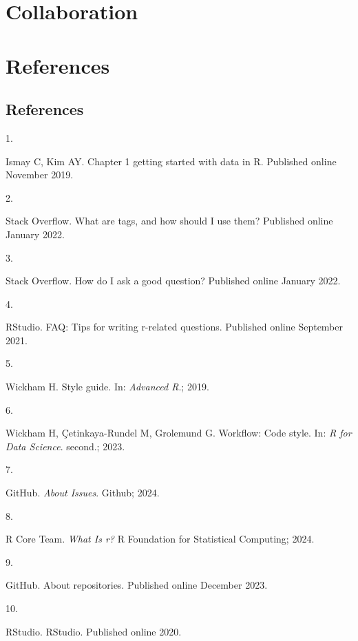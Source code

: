 \documentclass[
  letterpaper,
  DIV=11,
  numbers=noendperiod]{scrreprt}
\newlength{\cslhangindent}
\newlength{\csllabelwidth}
\newenvironment{CSLReferences}[2] %
 {\begin{list}{}{%
  \setlength{\itemindent}{0pt}
  \setlength{\leftmargin}{0pt}
  \setlength{\parsep}{0pt}
  \ifodd #1
   \setlength{\leftmargin}{\cslhangindent}
   \setlength{\itemindent}{-1\cslhangindent}
  \fi
  \setlength{\itemsep}{#2\baselineskip}}}
 {\end{list}}
\newcommand{\CSLLeftMargin}[1]{\parbox[t]{\csllabelwidth}{\strut#1\strut}}
\newcommand{\CSLRightInline}[1]{\parbox[t]{\linewidth - \csllabelwidth}{\strut#1\strut}}
\begin{document}
\part{Collaboration}

\part{References}

\chapter{References}\label{references-1}

\label{refs}
\begin{CSLReferences}{0}{1}
\CSLLeftMargin{1. }%
\CSLRightInline{Ismay C, Kim AY. Chapter 1 getting started with data in
{R}. Published online November 2019.}

\CSLLeftMargin{2. }%
\CSLRightInline{Stack Overflow. What are tags, and how should {I} use
them? Published online January 2022.}

\CSLLeftMargin{3. }%
\CSLRightInline{Stack Overflow. How do {I} ask a good question?
Published online January 2022.}

\CSLLeftMargin{4. }%
\CSLRightInline{RStudio. {FAQ}: Tips for writing r-related questions.
Published online September 2021.}

\CSLLeftMargin{5. }%
\CSLRightInline{Wickham H. Style guide. In: \emph{Advanced {R}}.; 2019.}

\CSLLeftMargin{6. }%
\CSLRightInline{Wickham H, Çetinkaya-Rundel M, Grolemund G. Workflow:
Code style. In: \emph{{R} for Data Science}. second.; 2023.}

\CSLLeftMargin{7. }%
\CSLRightInline{GitHub. \emph{About Issues}. Github; 2024.}

\CSLLeftMargin{8. }%
\CSLRightInline{R Core Team. \emph{What Is r?} R Foundation for
Statistical Computing; 2024.}

\CSLLeftMargin{9. }%
\CSLRightInline{GitHub. About repositories. Published online December
2023.}

\CSLLeftMargin{10. }%
\CSLRightInline{RStudio. {RStudio}. Published online 2020.}

\end{CSLReferences}
\end{document}
